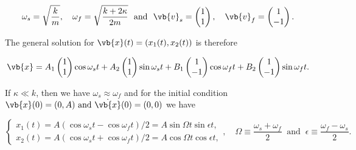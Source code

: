\documentclass[a4paper,12pt]{report}
\begin{document}
\begin{equation}
	\omega _{s} = \sqrt{\frac{k}{m} }, \quad  \omega _{f} = \sqrt{\frac{k+2\kappa }{2m} } ~\text { and }~ \vb{v} _{s} = \begin{pmatrix}
		 1 \\
		 1 \\
	\end{pmatrix}, \quad \vb{v} _{f} = \begin{pmatrix}
		 1 \\
		 -1 \\
	\end{pmatrix}.
\end{equation}

The general solution for \(\vb{x} (t) = (x_1(t) ,x_2 (t))\) is therefore

\begin{equation}
	\vb{x} = A_1 \begin{pmatrix}
		 1 \\
		 1 \\
	\end{pmatrix} \cos \omega _{s}t  + A_2 \begin{pmatrix}
		 1 \\
		 1 \\
	\end{pmatrix} \sin \omega _{s}t  + B_1 \begin{pmatrix}
		 1 \\
		 -1 \\
	\end{pmatrix} \cos \omega _{f}t  + B_2 \begin{pmatrix}
		 1 \\
		 -1 \\
	\end{pmatrix} \sin \omega _{f}t .
\end{equation}

If \(\kappa \ll k\), then we have \(\omega _{s} \approx \omega _{f}  \) and for the initial condition \(\vb{x} (0) = (0,A) \text { and } \dot{\vb{x} }(0) = (0,0) \) we have 

\begin{equation}
	\begin{cases}
		x_1 (t) = A(\cos \omega _{s}t - \cos \omega _{f}t ) /2 = A \sin \Omega t \sin \epsilon t,\\
		x_2 (t) = A(\cos \omega _{s}t + \cos \omega _{f}t ) /2 = A \cos \Omega t \cos \epsilon t,
	\end{cases}, \quad \Omega \equiv \frac{\omega _{s}+\omega _{f}  }{2} ~\text { and }~ \epsilon \equiv \frac{\omega _{f}-\omega _{s}  }{2}.  
\end{equation}
\end{document}
